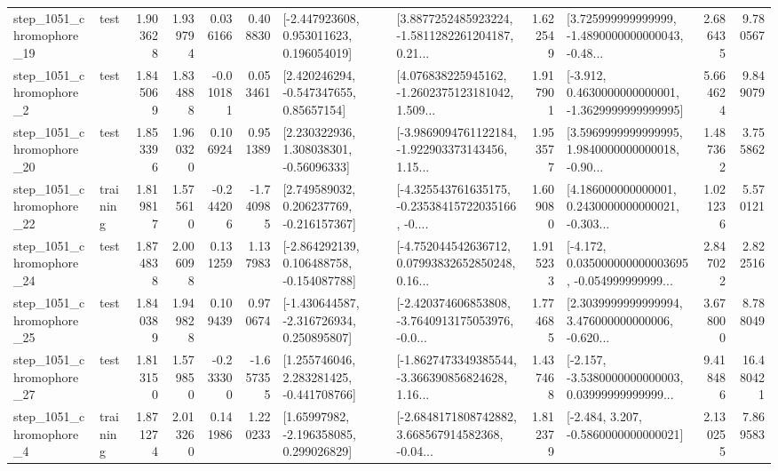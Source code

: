 \begin{tabular}{llrrrrllrlrr}
 step\_1051\_chromophore\_19 &      test &      1.903628 &    1.939794 &      0.036166 &  0.408830 &    [-2.447923608, 0.953011623, 0.196054019] &  [3.8877252485923224, -1.5811282261204187, 0.21... &       1.622549 &  [3.725999999999999, -1.4890000000000043, -0.48... &            2.686435 &          9.780567 \\
  step\_1051\_chromophore\_2 &      test &      1.845069 &    1.834888 &     -0.010181 &  0.053461 &     [2.420246294, -0.547347655, 0.85657154] &  [4.076838225945162, -1.2602375123181042, 1.509... &       1.917901 &  [-3.912, 0.4630000000000001, -1.3629999999999995] &            5.664624 &          9.849079 \\
 step\_1051\_chromophore\_20 &      test &      1.853396 &    1.960320 &      0.106924 &  0.951389 &     [2.230322936, 1.308038301, -0.56096333] &  [-3.9869094761122184, -1.922903373143456, 1.15... &       1.953577 &  [3.5969999999999995, 1.9840000000000018, -0.90... &            1.487362 &          3.755862 \\
 step\_1051\_chromophore\_22 &  training &      1.819817 &    1.575610 &     -0.244206 & -1.740985 &    [2.749589032, 0.206237769, -0.216157367] &  [-4.325543761635175, -0.23538415722035166, -0.... &       1.609080 &  [4.186000000000001, 0.2430000000000021, -0.303... &            1.021236 &          5.570121 \\
 step\_1051\_chromophore\_24 &      test &      1.874838 &    2.006098 &      0.131259 &  1.137983 &   [-2.864292139, 0.106488758, -0.154087788] &  [-4.752044542636712, 0.07993832652850248, 0.16... &       1.915233 &  [-4.172, 0.035000000000003695, -0.054999999999... &            2.847022 &          2.822516 \\
 step\_1051\_chromophore\_25 &      test &      1.840389 &    1.949828 &      0.109439 &  0.970674 &   [-1.430644587, -2.316726934, 0.250895807] &  [-2.420374606853808, -3.7640913175053976, -0.0... &       1.774685 &  [2.3039999999999994, 3.476000000000006, -0.620... &            3.678000 &          8.788049 \\
 step\_1051\_chromophore\_27 &      test &      1.813150 &    1.579850 &     -0.233300 & -1.657355 &    [1.255746046, 2.283281425, -0.441708766] &  [-1.8627473349385544, -3.366390856824628, 1.16... &       1.437468 &  [-2.157, -3.5380000000000003, 0.03999999999999... &            9.418486 &         16.480421 \\
  step\_1051\_chromophore\_4 &  training &      1.871274 &    2.013260 &      0.141986 &  1.220233 &     [1.65997982, -2.196358085, 0.299026829] &  [-2.6848171808742882, 3.668567914582368, -0.04... &       1.812379 &               [-2.484, 3.207, -0.5860000000000021] &            2.130255 &          7.869583 \\

\end{tabular}
